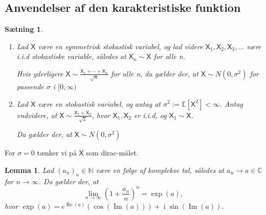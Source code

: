 \documentclass{article}
\newcommand{\N}{\mathbb{N}}
\newcommand{\C}{\mathbb{C}}
\newcommand{\E}{\mathbb{E}}
\newcommand{\1}{\mathbbm{1}}
\newcommand{\X}{\mathsf{X}}
\newcommand{\icomp}{\operatorname{i}}
\newtheorem{lemma}[theorem]{Lemma}
\newtheorem{proposition}[theorem]{Sætning}
\theoremstyle{boxed}
\begin{document}
\subsection{Anvendelser af den karakteristiske funktion}
\begin{theorem-box}
    \begin{proposition}
        \begin{enumerate}
            \item[\textnormal{(i)}] Lad $\X$ være en symmetrisk stokastisk variabel, og lad videre $\X_1,\X_2,\X_3,\dots$ være i.i.d stokastiske variable, således at $\X_n\sim \X$ for alle n.
            
            Hvis yderligere $\X\sim\frac{\X_1+\cdots+\X_n}{\sqrt{n}}$ for alle n, da gælder der, at $\X\sim N(0,\sigma^2)$ for passende $\sigma$ i $[0,\infty)$
            \item[\textnormal{(ii)}] Lad $\X$ være en stokastisk variabel, og antag at $\sigma^2:=\E[\X^2]<\infty.$ Antag endvidere, at $\X\sim\frac{\X_1+\X_2}{\sqrt{2}}$, hvor $\X_1,\X_2$ er i.i.d, og $\X_1\sim \X$.

            Da gælder der, at $\X\sim N(0,\sigma^2)$
        \end{enumerate}
    \end{proposition}
\end{theorem-box}
For $\sigma=0$ tænker vi på $\X$ som dirac-målet.
\begin{theorem-box}
    \begin{lemma}
        Lad $(a_n)_n\in\N$ være en følge af komplekse tal, således at $a_n\longrightarrow a \in\C$ for $n\rightarrow \infty$. Da gælder der, at $$\lim_{n\rightarrow\infty}\left(1+\frac{a_n}{n}\right)^n=\exp(a),$$
        hvor $\exp(a)=e^{\operatorname{Re}(a)}(\cos(\operatorname*{Im}(a)))+\icomp\sin(\operatorname{Im}(a)).$
    \end{lemma}
\end{theorem-box}
\end{document}
